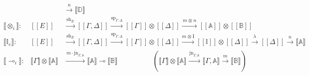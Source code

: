 \begin{align*}
     &&& \xrightarrow{\hspace{3pt}n\hspace{3pt}} \llbracket \mathbb{D} \rrbracket \\
     &\llbracket \otimes_i \rrbracket : & [\![E]\!] & \xrightarrow{\hspace{2pt}\text{sh}_{E}\hspace{2pt}}   [\![\Gamma,\Delta ]\!]   \xrightarrow{\hspace{1pt}\text{sp}_{\Gamma;\Delta}\hspace{1pt}}  [\![\Gamma ]\!] \otimes [\![\Delta ]\!]  \xrightarrow{\hspace{2pt} m \hspace{1pt} \otimes \hspace{1pt} n \hspace{2pt}} [\![\mathbb{A} ]\!] \otimes [\![\mathbb{B} ]\!] \\
     &\llbracket \mathbb{I}_e \rrbracket :  & [\![E]\!] & \xrightarrow{\hspace{2pt}\text{sh}_{E}\hspace{2pt}}   [\![\Gamma,\Delta ]\!]   \xrightarrow{\hspace{1pt}\text{sp}_{\Gamma;\Delta}\hspace{1pt}}  [\![\Gamma ]\!] \otimes [\![\Delta ]\!] \xrightarrow{ m \hspace{1pt} \otimes \hspace{1pt} \text{I}} [\![\mathbb{I} ]\!]\otimes [\![\Delta ]\!] \xrightarrow{\hspace{2pt} \lambda \hspace{3pt}} [\![\Delta ]\!]  \xrightarrow{\hspace{2pt} n \hspace{3pt}}  \llbracket \mathbb{A} \rrbracket    \\
      &\llbracket \multimap_i \rrbracket : & \llbracket \Gamma \rrbracket \otimes \llbracket \mathbb{A} \rrbracket & \xrightarrow{\hspace{2pt} \overline{m \cdot \text{jn}_{\Gamma;\mathbb{A}}}  \hspace{2pt}}  \llbracket \mathbb{A} \rrbracket \multimap \llbracket \mathbb{B} \rrbracket  \hspace{60pt} (\llbracket \Gamma \rrbracket \otimes \llbracket \mathbb{A} \rrbracket  \xrightarrow{\hspace{2pt} \text{jn}_{\Gamma; \mathbb{A}} \hspace{2pt}} \llbracket \Gamma, \mathbb{A} \rrbracket  \xrightarrow{\hspace{2pt} m \hspace{2pt}}  \llbracket \mathbb{B} \rrbracket )\\

\end{align*}
